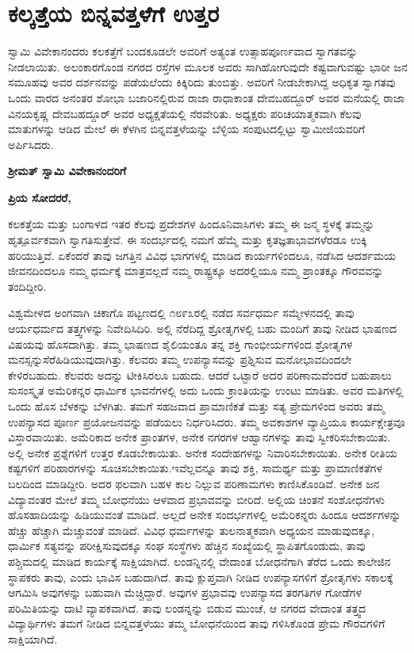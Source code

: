 
\chapter{ಕಲ್ಕತ್ತೆಯ ಬಿನ್ನವತ್ತಳೆಗೆ ಉತ್ತರ}

ಸ್ವಾಮಿ ವಿವೇಕಾನಂದರು ಕಲಕತ್ತೆಗೆ ಬಂದಕೂಡಲೇ ಅವರಿಗೆ ಅತ್ಯಂತ ಉತ್ಸಾಹಪೂರ್ಣವಾದ ಸ್ವಾಗತವನ್ನು ನೀಡಲಾಯಿತು. ಅಲಂಕಾರಗೊಂಡ ನಗರದ ರಸ್ತೆಗಳ ಮೂಲಕ ಅವರು ಸಾಗಿಹೋಗುವುದೇ ಕಷ್ಟವಾಗುವಷ್ಟು ಭಾರೀ ಜನ ಸಮೂಹವು ಅವರ ದರ್ಶನವನ್ನು ಪಡೆಯಲೆಂದು ಕಿಕ್ಕಿರಿದು ತುಂಬಿತ್ತು. ಅವರಿಗೆ ನೀಡಬೇಕಾಗಿದ್ದ ಅಧಿಕೃತ ಸ್ವಾಗತವು ಒಂದು ವಾರದ ಅನಂತರ ಶೋಭಾ ಬಜಾರಿನಲ್ಲಿರುವ ರಾಜಾ ರಾಧಾಕಾಂತ ದೇವಬಹದ್ದೂರ್​ ಅವರ ಮನೆಯಲ್ಲಿ ರಾಜಾ ವಿನಯಕೃಷ್ಣ ದೇವಬಹದ್ದೂರ್​ ಅವರ ಅಧ್ಯಕ್ಷತೆಯಲ್ಲಿ ನೆರ\-ವೇರಿತು. ಅಧ್ಯಕ್ಷರು ಪರಿಚಯಾತ್ಮಕವಾಗಿ ಕೆಲವು ಮಾತುಗಳನ್ನು ಆಡಿದ ಮೇಲೆ ಈ ಕೆಳಗಿನ ಬಿನ್ನವತ್ತಳೆಯನ್ನು ಬೆಳ್ಳಿಯ ಸಂಪುಟದಲ್ಲಿಟ್ಟು ಸ್ವಾಮೀಜಿಯವರಿಗೆ ಅರ್ಪಿಸಿದರು.

\vskip 0.2cm

\textbf{ಶ‍್ರೀಮತ್​ ಸ್ವಾಮಿ ವಿವೇಕಾನಂದರಿಗೆ}

\textbf{ಪ್ರಿಯ ಸೋದರರೆ,}

\vskip 0.2cm

ಕಲಕತ್ತೆಯ ಮತ್ತು ಬಂಗಾಳದ ಇತರ ಕೆಲವು ಪ್ರದೇಶಗಳ ಹಿಂದೂನಿವಾಸಿಗಳು ತಮ್ಮ ಈ ಜನ್ಮ ಸ್ಥಳಕ್ಕೆ ತಮ್ಮನ್ನು ಹೃತ್ಪೂರ್ವಕವಾಗಿ ಸ್ವಾಗತಿಸುತ್ತೇವೆ. ಈ ಸಂದರ್ಭದಲ್ಲಿ ನಮಗೆ ಹೆಮ್ಮೆ ಮತ್ತು ಕೃತಜ್ಞತಾಭಾವಗಳೆರಡೂ ಉಕ್ಕಿ ಹರಿಯುತ್ತಿವೆ. ಏಕೆಂದರೆ ತಾವು ಜಗತ್ತಿನ ವಿವಿಧ ಭಾಗಗಳಲ್ಲಿ ಮಾಡಿದ ಕಾರ್ಯಗಳಿಂದಲೂ, ನಡೆಸಿದ ಆದರ್ಶಮಯ ಜೀವನದಿಂದಲೂ ನಮ್ಮ ಧರ್ಮಕ್ಕೆ ಮಾತ್ರವಲ್ಲದೆ ನಮ್ಮ ರಾಷ್ಟ್ರಕ್ಕೂ ಅದರಲ್ಲಿಯೂ ನಮ್ಮ ಪ್ರಾಂತಕ್ಕೂ ಗೌರವವನ್ನು ತಂದಿದ್ದೀರಿ.

\vskip 0.2cm

ವಿಶ್ವಮೇಳದ ಅಂಗವಾಗಿ ಚಿಕಾಗೊ ಪಟ್ಟಣದಲ್ಲಿ ೧೮೯೩ರಲ್ಲಿ ನಡೆದ ಸರ್ವಧರ್ಮ ಸಮ್ಮೇಳನದಲ್ಲಿ ತಾವು ಆರ್ಯಧರ್ಮದ ತತ್ತ್ವಗಳನ್ನು ನಿವೇದಿಸಿದಿರಿ. ಅಲ್ಲಿ ನೆರೆದಿದ್ದ ಶ್ರೋತೃಗಳಲ್ಲಿ ಬಹು ಮಂದಿಗೆ ತಾವು ನೀಡಿದ ಭಾಷಣದ ವಿಷಯವು ಹೊಸದಾಗಿತ್ತು. ತಮ್ಮ ಭಾಷಣದ ಶೈಲಿಯಂತೂ ತನ್ನ ಶಕ್ತಿ ಗಾಂಭೀರ್ಯಗಳಿಂದ ಶ್ರೋತೃಗಳ ಮನಸ್ಸನ್ನು\break ಸೆರೆಹಿಡಿಯುವುದಾಗಿತ್ತು. ಕೆಲವರು ತಮ್ಮ ಉಪನ್ಯಾಸವನ್ನು ಪ್ರಶ್ನಿಸುವ ಮನೋಭಾವದಿಂದಲೇ ಕೇಳಿರಬಹುದು. ಕೆಲವರು ಅದನ್ನು ಟೀಕಿಸಿರಲೂ ಬಹುದು. ಆದರೆ ಒಟ್ಟಾರೆ ಅದರ ಪರಿಣಾಮವೆಂದರೆ ಬಹುಪಾಲು ಸುಸಂಸ್ಕೃತ ಅಮೆರಿಕನ್ನರ ಧಾರ್ಮಿಕ ಭಾವನೆಗಳಲ್ಲಿ ಅದು ಒಂದು ಕ್ರಾಂತಿಯನ್ನು ಉಂಟು ಮಾಡಿತು. ಅವರ ಮತಿಗಳಲ್ಲಿ ಒಂದು ಹೊಸ ಬೆಳಕನ್ನು ಬೆಳಗಿತು. ತಮಗೆ ಸಹಜವಾದ ಪ್ರಾಮಾಣಿಕತೆ ಮತ್ತು ಸತ್ಯ ಪ್ರೇಮಗಳಿಂದ ಅವರು ತಮ್ಮ ಉಪನ್ಯಾಸದ ಪೂರ್ಣ ಪ್ರಯೋಜನವನ್ನು ಪಡೆಯಲು ನಿರ್ಧರಿಸಿದರು. ತಮ್ಮ ಅವಕಾಶಗಳ ವ್ಯಾಪ್ತಿಯೂ ಕಾರ್ಯಕ್ಷೇತ್ರವೂ ವಿಸ್ತಾರವಾಯಿತು. ಅಮೆರಿಕಾದ ಅನೇಕ ಪ್ರಾಂತಗಳ, ಅನೇಕ ನಗರಗಳ ಆಹ್ವಾನಗಳನ್ನು ತಾವು ಸ್ವೀಕರಿಸಬೇಕಾಯಿತು. ಅಲ್ಲಿ ಅನೇಕ ಪ್ರಶ್ನೆಗಳಿಗೆ ಉತ್ತರ ಕೊಡಬೇಕಾಯಿತು. ಅನೇಕ ಸಂದೇಹಗಳನ್ನು ನಿವಾರಿಸ\-ಬೇಕಾಯಿತು. ಅನೇಕ ರೀತಿಯ ಕಷ್ಟಗಳಿಗೆ ಪರಿಹಾರಗಳನ್ನು ಸೂಚಿಸಬೇಕಾಯಿತು.\break ಇವೆಲ್ಲವನ್ನೂ ತಾವು ಶಕ್ತಿ, ಸಾಮರ್ಥ್ಯ ಮತ್ತು ಪ್ರಾಮಾಣಿಕತೆಗಳ ಬಲದಿಂದ ಮಾಡಿದ್ದೀರಿ. ಅದರ ಫಲವಾಗಿ ಬಹಳ ಕಾಲ ನಿಲ್ಲುವ ಪರಿಣಾಮಗಳು ಕಾಣಿಸಿಕೊಂಡಿವೆ. ಅನೇಕ ಜನ ವಿದ್ಯಾವಂತರ ಮೇಲೆ ತಮ್ಮ ಬೋಧನೆಯು ಆಳವಾದ ಪ್ರಭಾವವನ್ನು ಬೀರಿದೆ. ಅಲ್ಲಿಯ ಚಿಂತನೆ ಸಂಶೋಧನೆಗಳು ಹೊಸಹಾದಿಯನ್ನು ಹಿಡಿಯುವಂತೆ ಮಾಡಿದೆ. ಅಲ್ಲದೆ ಅನೇಕ ಸಂದರ್ಭಗಳಲ್ಲಿ ಅಮೆರಿಕನ್ನರು ಹಿಂದೂ ಆದರ್ಶಗಳನ್ನು ಹೆಚ್ಚು ಹೆಚ್ಚಾಗಿ ಮೆಚ್ಚುವಂತೆ ಮಾಡಿದೆ. ವಿವಿಧ ಧರ್ಮಗಳನ್ನು ತುಲನಾತ್ಮಕವಾಗಿ ಅಧ್ಯಯನ ಮಾಡುವುದಕ್ಕೂ, ಧಾರ್ಮಿಕ ಸತ್ಯವನ್ನು ಪರೀಕ್ಷಿಸುವುದಕ್ಕೂ ಸಂಘ ಸಂಸ್ಥೆಗಳು ಹೆಚ್ಚಿನ ಸಂಖ್ಯೆಯಲ್ಲಿ ಸ್ಥಾಪಿತ\-ಗೊಂಡುದು, ತಾವು ಪಶ್ಚಿಮದಲ್ಲಿ ಮಾಡಿದ ಕಾರ್ಯಕ್ಕೆ ಸಾಕ್ಷಿಯಾಗಿದೆ. ಲಂಡನ್ನಿನಲ್ಲಿ ವೇದಾಂತ ಬೋಧನೆಗಾಗಿ ತೆರೆದ ಒಂದು ಕಾಲೇಜಿನ ಸ್ಥಾಪಕರು ತಾವು, ಎಂದು ಭಾವಿಸ ಬಹುದಾಗಿದೆ. ತಾವು ಕ್ಲುಪ್ತವಾಗಿ ನೀಡಿದ ಉಪನ್ಯಾಸಗಳಿಗೆ ಶ್ರೋತೃಗಳು ಸಕಾಲಕ್ಕೆ ಆಗಮಿಸಿ ಅವುಗಳನ್ನು ಬಹುವಾಗಿ ಮೆಚ್ಚಿದ್ದಾರೆ. ಅವುಗಳ ಪ್ರಭಾವವು ಉಪನ್ಯಾಸದ ತರಗತಿಗಳ ಗೋಡೆಗಳ ಪರಿಮಿತಿಯನ್ನು ದಾಟಿ ವ್ಯಾಪಕವಾಗಿದೆ. ತಾವು ಲಂಡನ್ನನ್ನು ಬಿಡುವ ಮುಂಚೆ, ಆ ನಗರದ ವೇದಾಂತ ತತ್ತ್ವದ ವಿದ್ಯಾರ್ಥಿಗಳು ತಮಗೆ ನೀಡಿದ ಬಿನ್ನವತ್ತಳೆಯು ತಮ್ಮ ಬೋಧನೆಯಿಂದ ತಾವು ಗಳಿಸಿಕೊಂಡ ಪ್ರೇಮ ಗೌರವಗಳಿಗೆ ಸಾಕ್ಷಿಯಾಗಿದೆ.

